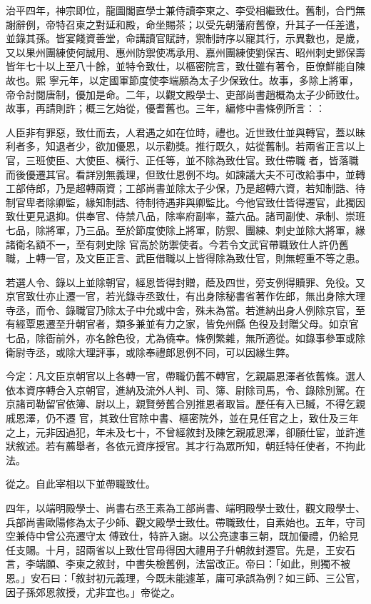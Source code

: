 \begin{pinyinscope}
 治平四年，神宗即位，龍圖閣直學士兼侍讀李柬之、李受相繼致仕。舊制，合門無謝辭例，帝特召柬之對延和殿，命坐賜茶；以受先朝藩府舊僚，升其子一任差遣，並錄其孫。皆宴餞資善堂，命講讀官賦詩，禦制詩序以寵其行，示異數也，是歲，又以果州團練使何誠用、惠州防禦使馮承用、嘉州團練使劉保吉、昭州刺史鄧保壽皆年七十以上至八十餘，並特令致仕，以樞密院言，致仕雖有著令，臣僚鮮能自陳故也。熙
 寧元年，以定國軍節度使李端願為太子少保致仕。故事，多除上將軍，帝令討閱唐制，優加是命。二年，以觀文殿學士、吏部尚書趙概為太子少師致仕。故事，再請則許；概三乞始從，優耆舊也。三年，編修中書條例所言：：



 人臣非有罪惡，致仕而去，人君遇之如在位時，禮也。近世致仕並與轉官，蓋以昧利者多，知退者少，欲加優恩，以示勸獎。推行既久，姑從舊制。若兩省正言以上官，三班使臣、大使臣、橫行、正任等，並不除為致仕官。致仕帶職
 者，皆落職而後優遷其官。看詳別無義理，但致仕恩例不均。如諫議大夫不可改給事中，並轉工部侍郎，乃是超轉兩資；工部尚書並除太子少保，乃是超轉六資，若知制誥、待制官卑者除卿監，緣知制誥、待制待遇非與卿監比。今他官致仕皆得遷官，此獨因致仕更見退抑。供奉官、侍禁八品，除率府副率，蓋六品。諸司副使、承制、崇班七品，除將軍，乃三品。至於節度使除上將軍，防禦、團練、刺史並除大將軍，緣諸衛名額不一，至有刺史除
 官高於防禦使者。今若令文武官帶職致仕人許仍舊職，上轉一官，及文臣正言、武臣借職以上皆得除為致仕官，則無輕重不等之患。



 若選人令、錄以上並除朝官，經恩皆得封贈，蔭及四世，旁支例得贖罪、免役。又京官致仕亦止遷一官，若光錄寺丞致仕，有出身除秘書省著作佐郎，無出身除大理寺丞，而令、錄職官乃除太子中允或中舍，殊未為當。若進納出身人例除京官，至有經覃恩遷至升朝官者，類多兼並有力之家，皆免州縣
 色役及封贈父母。如京官七品，除衙前外，亦名餘色役，尤為僥幸。條例繁雜，無所適從。如錄事參軍或除衛尉寺丞，或除大理評事，或除奉禮郎恩例不同，可以因緣生弊。



 今定：凡文臣京朝官以上各轉一官，帶職仍舊不轉官，乞親屬恩澤者依舊條。選人依本資序轉合入京朝官，進納及流外人判、司、簿、尉除司馬，令、錄除別駕。在京諸司勒留官依簿、尉以上，親賢勞舊合別推恩者取旨。歷任有入已贓，不得乞親戚恩澤，仍不遷
 官，其致仕官除中書、樞密院外，並在見任官之上，致仕及三年之上，元非因過犯，年未及七十，不曾經敘封及陳乞親戚恩澤，卻願仕宦，並許進狀敘述。若有薦舉者，各依元資序授官。其才行為眾所知，朝廷特任使者，不拘此法。



 從之。自此宰相以下並帶職致仕。



 四年，以端明殿學士、尚書右丞王素為工部尚書、端明殿學士致仕，觀文殿學士、兵部尚書歐陽修為太子少師、觀文殿學士致仕。帶職致仕，自素始也。五年，守司空兼侍中曾公亮遷守太
 傅致仕，特許入謝。以公亮逮事三朝，既加優禮，仍給見任支賜。十月，詔兩省以上致仕官毋得因大禮用子升朝敘封遷官。先是，王安石言，李端願、李柬之敘封，中書失檢舊例，法當改正。帝曰：「如此，則獨不被恩。」安石曰：「敘封初元義理，今既未能遽革，庸可承誤為例？如三師、三公官，因子孫郊恩敘授，尤非宜也。」帝從之。




\end{pinyinscope}
